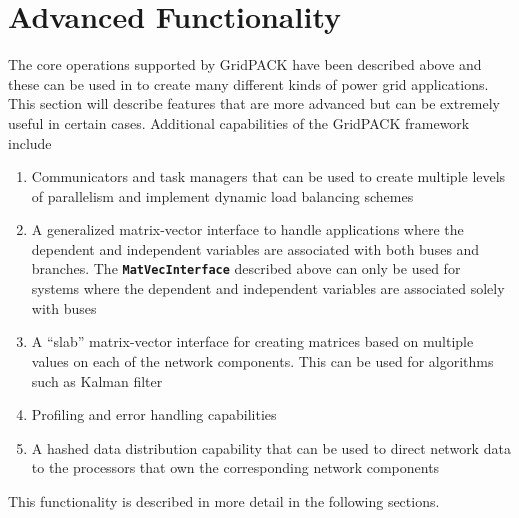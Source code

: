 \chapter{Advanced Functionality}

The core operations supported by GridPACK have been described above and these can be used in to create many different kinds of power grid applications. This section will describe features that are more advanced but can be extremely useful in certain cases. Additional capabilities of the GridPACK framework include
\begin{enumerate}
\item  Communicators and task managers that can be used to create multiple levels of parallelism and implement dynamic load balancing schemes

\item  A generalized matrix-vector interface to handle applications where the dependent and independent variables are associated with both buses and branches. The \texttt{\textbf{MatVecInterface}} described above can only be used for systems where the dependent and independent variables are associated solely with buses

\item  A ``slab'' matrix-vector interface for creating matrices based on multiple values on each of the network components. This can be used for algorithms such as Kalman filter

\item  Profiling and error handling capabilities

\item  A hashed data distribution capability that can be used to direct network data to the processors that own the corresponding network components
\end{enumerate}

This functionality is described in more detail in the following sections.
\newline
\hyperlink{topDoc}{\color{blue}{Top}}
